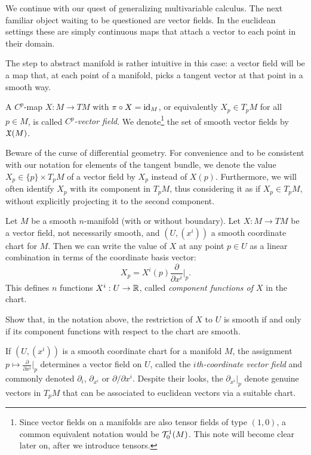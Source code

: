 We continue with our quest of generalizing multivariable calculus.
The next familiar object waiting to be questioned are vector fields.
In the euclidean settings these are simply continuous maps that attach a vector to each point in their domain.

The step to abstract manifold is rather intuitive in this case: a vector field will be a map that, at each point of a manifold, picks a tangent vector at that point in a smooth way.

\begin{defn}
    A $C^p$-map $X: M \to TM$ with $\pi\circ X = \operatorname{id}_M$, or equivalently $X_p\in T_pM$ for all $p\in M$, is called \emph{$C^p$-vector field}.
    We denote\footnote{Since vector fields on a manifolds are also tensor fields of type $(1,0)$, a common equivalent notation would be $\mathcal{T}_0^1(M)$.
    This note will become clear later on, after we introduce tensors.} the set of smooth vector fields by $\mathfrak{X}(M)$.
\end{defn}

Beware of the curse of differential geometry. 
For convenience and to be consistent with our notation for elements of the tangent bundle, we denote the value $X_p\in\{p\}\times T_p M$ of a vector field by $X_p$ instead of $X(p)$.
Furthermore, we will often identify $X_p$ with its component in $T_pM$, thus considering it as if $X_p\in T_pM$, without explicitly projecting it to the second component.

Let $M$ be a smooth $n$-manifold (with or without boundary).
Let $X:M\to TM$ be a vector field, not necessarily smooth, and $(U, (x^i))$ a smooth coordinate chart for $M$. Then we can write the value of $X$ at any point $p\in U$ as a linear combination in terms of the coordinate basis vector:
\begin{equation}\label{eq:vfCoordBAsis}
    X_p = X^i(p) \frac{\partial}{\partial x^i}\Big|_p.
\end{equation}
This defines $n$ functions $X^i: U\to\mathbb{R}$, called \emph{component functions of $X$} in the chart.

\begin{exe}
    Show that, in the notation above, the restriction of $X$ to $U$ is smooth if and only if its component functions with respect to the chart are smooth.
\end{exe}

\begin{ex}
    If $(U, (x^i))$ is a smooth coordinate chart for a manifold $M$, the assignment $p \mapsto \frac{\partial}{\partial x^i}\big|_p$ determines a vector field on $U$, called the \emph{$i$th-coordinate vector field} and commonly denoted $\partial_{i}$, $\partial_{x^i}$ or $\partial/\partial x^i$.
    Despite their looks, the $\partial_{x^i}|_p$ denote genuine vectors in $T_p M$ that can be associated to euclidean vectors via a suitable chart.
\end{ex}

